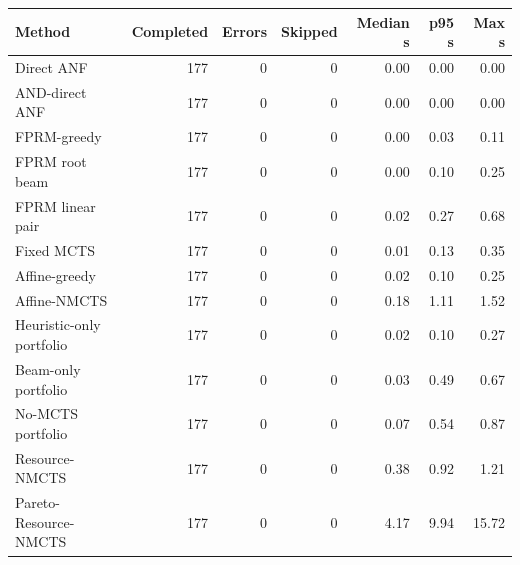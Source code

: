 \begin{tabular}{lrrrrrr}
\toprule
Method & Completed & Errors & Skipped & Median s & p95 s & Max s \\
\midrule
Direct ANF & 177 & 0 & 0 & 0.00 & 0.00 & 0.00 \\
AND-direct ANF & 177 & 0 & 0 & 0.00 & 0.00 & 0.00 \\
FPRM-greedy & 177 & 0 & 0 & 0.00 & 0.03 & 0.11 \\
FPRM root beam & 177 & 0 & 0 & 0.00 & 0.10 & 0.25 \\
FPRM linear pair & 177 & 0 & 0 & 0.02 & 0.27 & 0.68 \\
Fixed MCTS & 177 & 0 & 0 & 0.01 & 0.13 & 0.35 \\
Affine-greedy & 177 & 0 & 0 & 0.02 & 0.10 & 0.25 \\
Affine-NMCTS & 177 & 0 & 0 & 0.18 & 1.11 & 1.52 \\
Heuristic-only portfolio & 177 & 0 & 0 & 0.02 & 0.10 & 0.27 \\
Beam-only portfolio & 177 & 0 & 0 & 0.03 & 0.49 & 0.67 \\
No-MCTS portfolio & 177 & 0 & 0 & 0.07 & 0.54 & 0.87 \\
Resource-NMCTS & 177 & 0 & 0 & 0.38 & 0.92 & 1.21 \\
Pareto-Resource-NMCTS & 177 & 0 & 0 & 4.17 & 9.94 & 15.72 \\
\bottomrule
\end{tabular}
